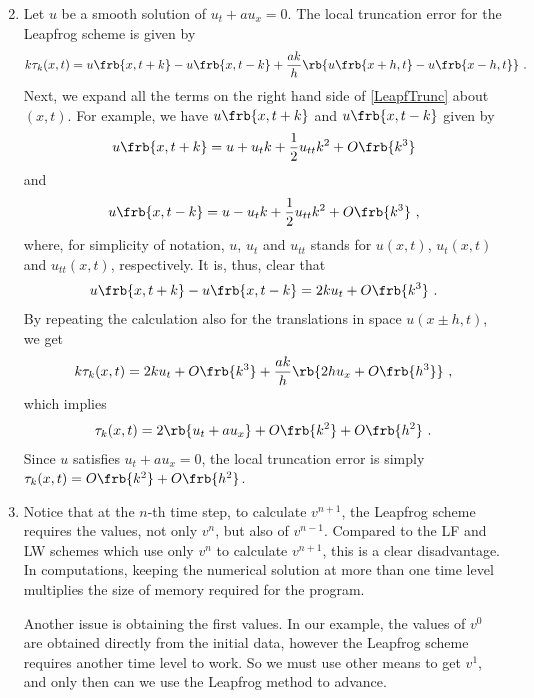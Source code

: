 \documentclass{article}
\begin{document}
\begin{exerciseList}
\item
\begin{enumerate}\setcounter{enumii}{1}
\item
Let $u$ be a smooth solution of $u_t+au_x=0$. The local truncation error for the Leapfrog scheme is given by 
\begin{gather} \label{LeapfTrunc}
	k\tau_k(x,t)=u\frb{x,t+k}-u\frb{x,t-k}+\frac{ak}{h}\rb{u\frb{x+h,t}-u\frb{x-h,t}}\ . 
\end{gather}
Next, we expand all the terms on the right hand side of \eqref{LeapfTrunc} about $(x,t)$. For example, we have $u\frb{x,t+k}$ and $u\frb{x,t-k}$ given by 
\begin{gather}
	u\frb{x,t+k}=u +u_tk +\frac{1}{2}u_{tt}k^2+O\frb{k^3} 
\end{gather}
and
\begin{gather}
	u\frb{x,t-k}=u -u_tk +\frac{1}{2}u_{tt}k^2+O\frb{k^3}\ , 
\end{gather}
where, for simplicity of notation, $u$, $u_t$ and $u_{tt}$ stands for $u(x,t)$, $u_t(x,t)$ and $u_{tt}(x,t)$, respectively. It is, thus, clear that 
\begin{gather}
	u\frb{x,t+k}-u\frb{x,t-k}=2ku_t+O\frb{k^3}\ .
\end{gather}
By repeating the calculation also for the translations in space $u(x\pm h,t)$, we get 
\begin{gather}
	k\tau_k(x,t)=2ku_t+O\frb{k^3} +\frac{ak}{h}\rb{2hu_x+O\frb{h^3}}\ , 
\end{gather}
which implies 
\begin{gather}
	\tau_k(x,t)=2\rb{u_t+au_x}+O\frb{k^2}+O\frb{h^2}\ . 
\end{gather}
Since $u$ satisfies $u_t+au_x=0$, the local truncation error is simply $\tau_k(x,t)=O\frb{k^2}+O\frb{h^2}$. 

\item
Notice that at the $n$-th time step, to calculate $v^{n+1}$, the Leapfrog scheme requires the values, not only $v^n$, but also of $v^{n-1}$.
Compared to the LF and LW schemes which use only $v^n$ to calculate $v^{n+1}$, this is a clear disadvantage. In computations, keeping the numerical solution at more than one time level multiplies the size of memory required for the program.

Another issue is obtaining the first values. In our example, the values of $v^0$ are obtained directly from the initial data, however the Leapfrog scheme requires another time level to work.
So we must use other means to get $v^1$, and only then can we use the Leapfrog method to advance.
\end{enumerate}







\end{exerciseList}
\end{document}
